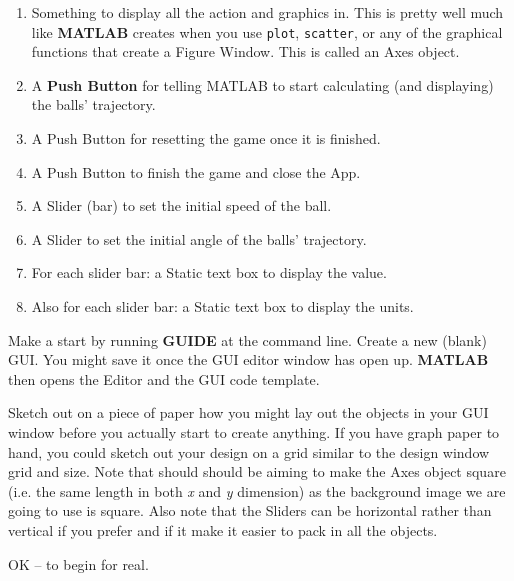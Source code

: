 \documentclass{tufte-book} %
\begin{document}
\begin{enumerate}[noitemsep]
\setlength{\itemindent}{.2in}
\item Something to display all the action and graphics in. This is pretty well much like \textbf{MATLAB} creates when you use \texttt{plot}, \texttt{scatter}, or any of the graphical functions that create a \textsf{Figure Window}. This is called an \textsf{Axes} object. 
\item A \textbf{Push Button} for telling MATLAB to start calculating (and displaying) the balls' trajectory.
\item A \textsf{Push Button} for resetting the game once it is finished.
\item A \textsf{Push Button} to finish the game and close the App.
\item A \textsf{Slider} (bar) to set the initial speed of the ball.
\item A \textsf{Slider} to set the initial angle of the balls' trajectory.
\item For each slider bar: a \textsf{Static text box} to display the value.
\item Also for each slider bar: a \textsf{Static text box} to display the units.
\end{enumerate}

Make a start by running \textbf{GUIDE} at the command line. Create a new (blank) GUI. You might save it once the GUI editor window has open up. \textbf{MATLAB} then opens the \textsf{Editor} and the GUI code template.

Sketch out on a piece of paper how you might lay out the objects in your GUI window before you actually start to create anything.
If you have graph paper to hand, you could sketch out your design on a grid similar to the design window grid and size. Note that should should be aiming to make the \textsf{Axes} object square (i.e. the same length in both \textit{x} and \textit{y} dimension) as the background image we are going to use is square. Also note that the \textsf{Sliders} can be horizontal rather than vertical if you prefer and if it make it easier to pack in all the objects.

OK -- to begin for real.
\end{document}
